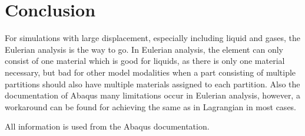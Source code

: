 \documentclass[12pt]{article}
\begin{document}
\newpage
\section{Conclusion}

For simulations with large displacement, especially including liquid and gases, the Eulerian analysis is the way to go. In Eulerian analysis, the element can only consist of one material which is good for liquids, as there is only one material necessary, but bad for other model modalities when a part consisting of multiple partitions should also have multiple materials assigned to each partition. Also the documentation of Abaqus many limitations occur in Eulerian analysis, however, a workaround can be found for achieving the same as in Lagrangian in most cases.

\vspace{5mm}
\noindent All information is used from the Abaqus documentation. 
\end{document}
